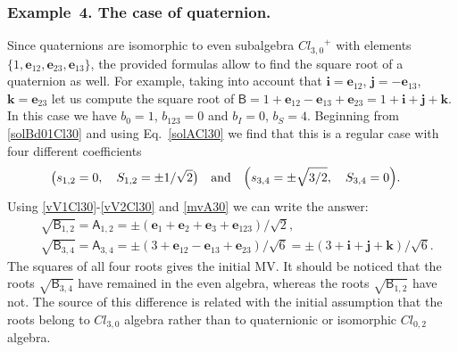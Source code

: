 \documentclass{birkjour}
\newcommand{\e}[1]{\mathbf{e}_{#1}} %
\newcommand{\cl}[2]{\ensuremath{\mathit{Cl}_{#1,#2}}}
\def\A{\mathsf{A}}
\def\B{\mathsf{B}}
\def\e#1{\mathbf{e}_{#1}} %
\begin{document}
\subsubsection*{Example~4. The case of quaternion.}
Since quaternions are isomorphic to even subalgebra
$\cl{3}{0}^{+}$ with  elements $\{1,\e{12},\e{23}, \e{13}\}$, the
provided formulas allow to find the square root of a quaternion as
well. For example, taking into account that $\mathbf{i} =\e{12}$,
$\mathbf{j}=-\e{13}$, $\mathbf{k}=\e{23}$ let us compute the
square root of
$\B=1+\e{12}-\e{13}+\e{23}=1+\mathbf{i}+\mathbf{j}+\mathbf{k}$. In
this case we have  $b_0=1$, $b_{123}=0$ and $b_I=0$, $b_S=4$.
Beginning  from \eqref{solBd01Cl30} and using Eq.~\eqref{solACl30}
we find that this is a regular case with four different
coefficients
\begin{equation}\begin{split}\label{ex4}
  &\bigl(s_{1,2}=0,\quad S_{1,2}=\pm 1/\sqrt{2}\bigr)\quad \text{and}\quad
  \Bigl(s_{3,4}=\pm \sqrt{3/2},\quad S_{3,4}=0\Bigr).
\end{split}\end{equation}
Using \eqref{vV1Cl30}-\eqref{vV2Cl30} and \eqref{mvA30} we can write the answer:
\begin{equation}\begin{split}\label{ex4fa}
  &\sqrt{\B_{1,2}} =\A_{1,2}= \pm (\e{1} +\e{2}+\e{3}+\e{1 2 3})/\sqrt{2},\\
  &\sqrt{\B_{3,4}}= \A_{3,4}= \pm(3 +\e{12}-\e{13}+\e{23})/\sqrt{6}=\pm(3 +\mathbf{i}+\mathbf{j}+\mathbf{k})/\sqrt{6}.
\end{split}\end{equation}
The squares  of all four roots gives the initial MV. It should be
noticed that the roots $\sqrt{\B_{3,4}}$ have remained in the even
algebra, whereas  the roots $\sqrt{\B_{1,2}}$ have not. The source
of this difference is related with the initial assumption that the
roots belong to  \cl{3}{0} algebra rather than to quaternionic or
isomorphic \cl{0}{2} algebra.
\end{document}
